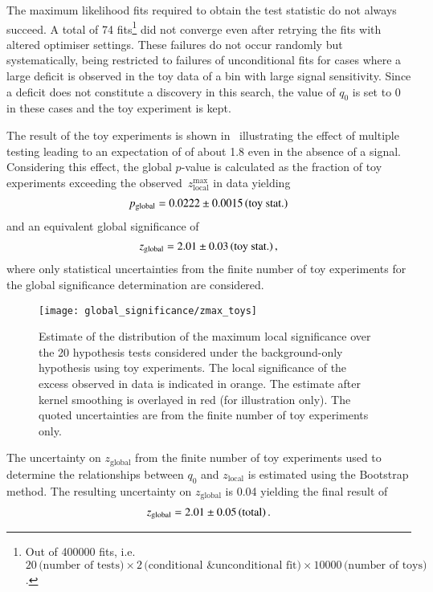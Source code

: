 The maximum likelihood fits required to obtain the test statistic do
not always succeed. A total of \num{74} fits\footnote{Out of
  \num{400000} fits, i.e.\
  $20\,\text{(number of tests)} \times 2\,\text{(conditional \&
    unconditional fit)} \times \num{10000}\,\text{(number of toys)}$.}
did not converge even after retrying the fits with altered optimiser
settings. These failures do not occur randomly but systematically,
being restricted to failures of unconditional fits for cases where a
large deficit is observed in the toy data of a bin with large signal
sensitivity. Since a deficit does not constitute a discovery in this
search, the value of $q_0$ is set to 0 in these cases and the toy
experiment is kept.

The result of the toy experiments is shown in~
illustrating the effect of multiple testing leading to an expectation
of \Zmaxlocal of about \num{1.8} even in the absence of a
signal. Considering this effect, the global $p$-value is calculated as
the fraction of toy experiments exceeding the
observed~$z_{\text{local}}^{\text{max}}$ in data yielding
\begin{align*}
  \pglobal = \num{0.0222}\numerrt{0.0015}{toy stat.}
\end{align*}
and an equivalent global significance of
\begin{align*}
  z_{\text{global}} = \num{2.01}\numerrt{0.03}{toy stat.} \,\text{,}
\end{align*}
where only statistical uncertainties from the finite number of toy
experiments for the global significance determination are
considered.

\begin{figure}[htbp]
  \centering

  \texttt{[image: global\_significance/zmax\_toys]}

  \caption{Estimate of the distribution of the maximum local
    significance over the 20 hypothesis tests considered under the
    background-only hypothesis using toy experiments. The local
    significance of the excess observed in data is indicated in
    orange. The estimate after kernel smoothing is overlayed in red
    (for illustration only). The quoted uncertainties are from the
    finite number of toy experiments only.}%
  \label{fig:zmax_toys}
\end{figure}

The uncertainty on $z_{\text{global}}$ from the finite number of toy
experiments used to determine the relationships between $q_0$ and
$z_{\text{local}}$ is estimated using the Bootstrap method. The
resulting uncertainty on $z_{\text{global}}$ is \num{0.04} yielding
the final result of
\begin{align*}
  z_{\text{global}} = \num{2.01}\numerrt{0.05}{total} \,\text{.}
\end{align*}


